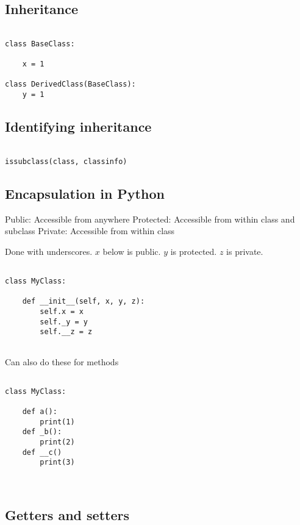 
\subsection{Inheritance}

\begin{verbatim}

class BaseClass:

    x = 1

class DerivedClass(BaseClass):
    y = 1

\end{verbatim}

\subsection{Identifying inheritance}

\begin{verbatim}

issubclass(class, classinfo)
\end{verbatim}

\subsection{Encapsulation in Python}

Public: Accessible from anywhere
Protected: Accessible from within class and subclass
Private: Accessible from within class

Done with underscores. \(x\) below is public. \(y\) is protected. \(z\) is private.
\begin{verbatim}

class MyClass:

    def __init__(self, x, y, z):
        self.x = x
        self._y = y
        self.__z = z
        
\end{verbatim}

Can also do these for methods

\begin{verbatim}

class MyClass:

    def a():
        print(1)
    def _b():
        print(2)
    def __c()
        print(3)

        
\end{verbatim}


\subsection{Getters and setters}

